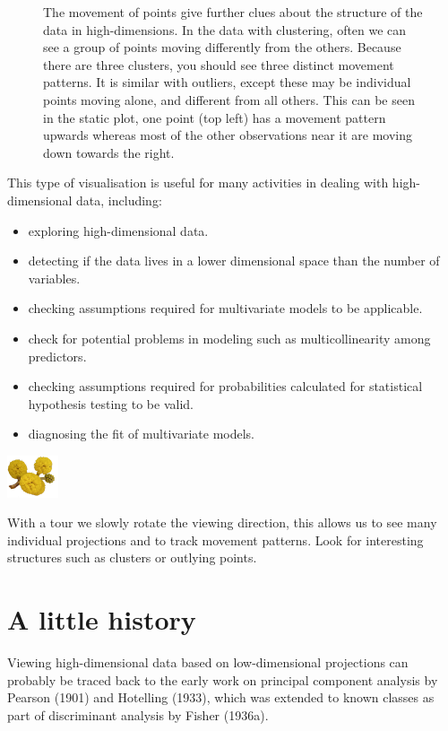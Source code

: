 \documentclass[
  letterpaper,
]{krantz}
\providecommand{\tightlist}{%
  \setlength{\itemsep}{0pt}\setlength{\parskip}{0pt}}\usepackage{longtable,booktabs,array}
\newcommand{\infobox}[1]{%
\noindent\colorbox{info!30}{%
\begin{minipage}{0.98\linewidth}%
    \centering%
    \begin{minipage}[c]{0.15\linewidth} %
      \includegraphics[width=1.5cm]{images/mulga-flowers2.png} %
    \end{minipage}%
    \hfill %
    \begin{minipage}[c]{0.8\linewidth} %
      \bigskip%
      \textsf{#1}%
      \bigskip%
    \end{minipage}%
    \hspace*{3mm}%
  \end{minipage}%
}%
}
\begin{document}
\begin{figure}
\begin{minipage}{0.50\linewidth}
{}


\end{minipage}%

\caption{\label{fig-trails}The movement of points give further clues
about the structure of the data in high-dimensions. In the data with
clustering, often we can see a group of points moving differently from
the others. Because there are three clusters, you should see three
distinct movement patterns. It is similar with outliers, except these
may be individual points moving alone, and different from all others.
This can be seen in the static plot, one point (top left) has a movement
pattern upwards whereas most of the other observations near it are
moving down towards the right.}

\end{figure}%

This type of visualisation is useful for many activities in dealing with
high-dimensional data, including:

\begin{itemize}
\tightlist
\item
  exploring high-dimensional data.
\item
  detecting if the data lives in a lower dimensional space than the
  number of variables.
\item
  checking assumptions required for multivariate models to be
  applicable.
\item
  check for potential problems in modeling such as multicollinearity
  among predictors.
\item
  checking assumptions required for probabilities calculated for
  statistical hypothesis testing to be valid.
\item
  diagnosing the fit of multivariate models.
\end{itemize}

\infobox{With a tour we slowly rotate the viewing direction, this allows us to see many individual projections and to track movement patterns. Look for interesting structures such as clusters or outlying points.}

\section{A little history}\label{a-little-history}

Viewing high-dimensional data based on low-dimensional projections can
probably be traced back to the early work on principal component
analysis by Pearson (1901) and Hotelling (1933), which was extended to
known classes as part of discriminant analysis by Fisher (1936a).
\end{document}
